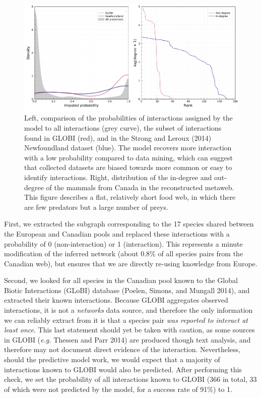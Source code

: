 \documentclass[11pt]{article}
\makeatletter
\def\maxwidth{\ifdim\Gin@nat@width>\linewidth\linewidth
\else\Gin@nat@width\fi}
\let\Oldincludegraphics\includegraphics
\renewcommand{\includegraphics}[1]{\Oldincludegraphics[width=\maxwidth]{#1}}
\makeatother
\begin{document}
\begin{figure}
\hypertarget{fig:inflation}{%
\centering
\includegraphics{figures/figure-validation.png}
\caption{Left, comparison of the probabilities of interactions assigned
by the model to all interactions (grey curve), the subset of
interactions found in GLOBI (red), and in the Strong and Leroux (2014)
Newfoundland dataset (blue). The model recovers more interaction with a
low probability compared to data mining, which can suggest that
collected datasets are biased towards more common or easy to identify
interactions. Right, distribution of the in-degree and out-degree of the
mammals from Canada in the reconstructed metaweb. This figure describes
a flat, relatively short food web, in which there are few predators but
a large number of preys.}\label{fig:inflation}
}
\end{figure}

First, we extracted the subgraph corresponding to the 17 species shared
between the European and Canadian pools and replaced these interactions
with a probability of 0 (non-interaction) or 1 (interaction). This
represents a minute modification of the inferred network (about 0.8\% of
all species pairs from the Canadian web), but ensures that we are
directly re-using knowledge from Europe.

Second, we looked for all species in the Canadian pool known to the
Global Biotic Interactions (GLoBI) database (Poelen, Simons, and Mungall
2014), and extracted their known interactions. Because GLOBI aggregates
observed interactions, it is not a \emph{networks} data source, and
therefore the only information we can reliably extract from it is that a
species pair \emph{was reported to interact at least once}. This last
statement should yet be taken with caution, as some sources in GLOBI
(\emph{e.g.} Thessen and Parr 2014) are produced though text analysis,
and therefore may not document direct evidence of the interaction.
Nevertheless, should the predictive model work, we would expect that a
majority of interactions known to GLOBI would also be predicted. After
performing this check, we set the probability of all interactions known
to GLOBI (366 in total, 33 of which were not predicted by the model, for
a success rate of 91\%) to 1.
\end{document}
